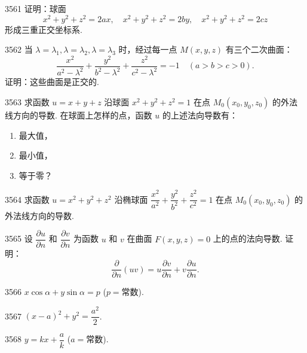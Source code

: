 \begin{prob}[M]{3561}
证明：球面
\[
x^2 + y^2 + z^2 = 2ax, \quad x^2 + y^2 + z^2 = 2by, \quad x^2 + y^2 + z^2 = 2cz
\]
形成三重正交坐标系.
\end{prob}

\begin{prob}[M]{3562}
当 $\lambda = \lambda_1, \lambda = \lambda_2, \lambda = \lambda_3$ 时，经过每一点 $M(x, y, z)$ 有三个二次曲面：
\[
\frac{x^2}{a^2 - \lambda^2} + \frac{y^2}{b^2 - \lambda^2} + \frac{z^2}{c^2 - \lambda^2} = -1 \quad (a > b > c > 0).
\]
证明：这些曲面是正交的.
\end{prob}

\begin{prob}[L]{3563}
求函数 $u = x + y + z$ 沿球面 $x^2 + y^2 + z^2 = 1$ 在点 $M_0(x_0, y_0, z_0)$ 的外法线方向的导数. 在球面上怎样的点，函数 $u$ 的上述法向导数有：
\begin{enumerate}[label=(\alph*), itemsep=2pt, topsep=3pt]
\item 最大值，
\item 最小值，
\item 等于零？
\end{enumerate}
\end{prob}

\begin{prob}[M]{3564}
求函数 $u = x^2 + y^2 + z^2$ 沿椭球面 $\dfrac{x^2}{a^2} + \dfrac{y^2}{b^2} + \dfrac{z^2}{c^2} = 1$ 在点 $M_0(x_0, y_0, z_0)$ 的外法线方向的导数.
\end{prob}

\begin{prob}[M]{3565}
设 $\dfrac{\partial u}{\partial n}$ 和 $\dfrac{\partial v}{\partial n}$ 为函数 $u$ 和 $v$ 在曲面 $F(x, y, z) = 0$ 上的点的法向导数. 证
明：
\[
\frac{\partial}{\partial n}(uv) = u\frac{\partial v}{\partial n} + v\frac{\partial u}{\partial n}.
\]
\end{prob}


\begin{prob}[S]{3566}
$x\cos\alpha + y\sin\alpha = p$ ($p = \text{常数}$).
\end{prob}

\begin{prob}[S]{3567}
$(x - a)^2 + y^2 = \dfrac{a^2}{2}$.
\end{prob}

\begin{prob}[S]{3568}
$y = kx + \dfrac{a}{k}$ ($a = \text{常数}$).
\end{prob}

